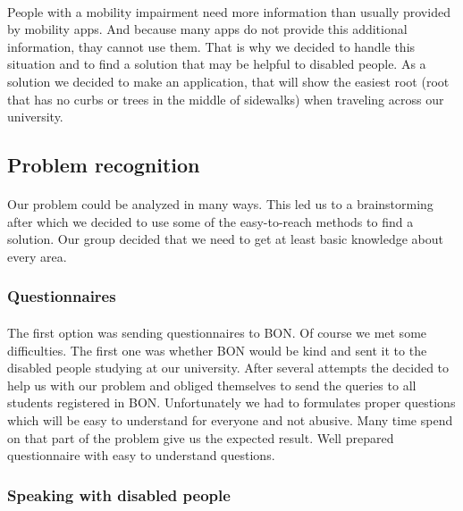 \documentclass[12pt]{article}
\begin{document}
\paragraph{}
People with a mobility impairment need more information than usually provided by mobility apps. And because many apps do not provide this additional information, thay cannot use them. That is why we decided to handle this situation and to find a solution that may be helpful to disabled people.
As a solution we decided to make an application, that will show the easiest root (root that has no curbs or trees in the middle of sidewalks) when traveling across our university. 



\subsection{Problem recognition}
\paragraph{}Our problem could be analyzed in many ways. This led us to a brainstorming after which we decided to use some of the easy-to-reach methods to find a solution. Our group decided that we need to get at least basic knowledge about every area. 
\subsubsection{Questionnaires}
\paragraph{}The first option was sending questionnaires to BON. Of course we met some difficulties. The first one was whether BON would be kind and sent it to the disabled people studying at our university. After several attempts the decided to help us with our problem and obliged themselves to send the queries to all students registered in BON. Unfortunately we had to formulates proper questions which will be easy to understand for everyone and not abusive. Many time spend on that part of the problem give us the expected result. Well prepared questionnaire with easy to understand questions. 
\subsubsection{Speaking with disabled people}
\end{document}
